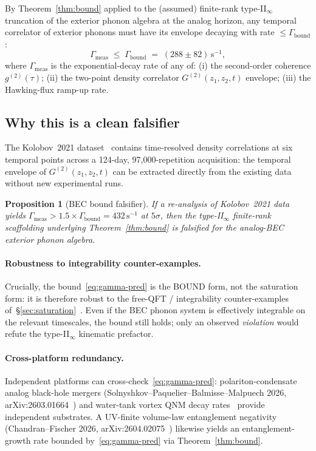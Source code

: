 \documentclass[12pt,a4paper]{article}
\newtheorem{proposition}[theorem]{Proposition}
\begin{document}
By Theorem~\ref{thm:bound} applied to the (assumed) finite-rank
type-II$_\infty$ truncation of the exterior phonon algebra at the
analog horizon, any temporal correlator of exterior phonons must
have its envelope decaying with rate $\le \Gamma_{\mathrm{bound}}$:
\begin{equation}
  \Gamma_{\mathrm{meas}}
  \;\le\;
  \Gamma_{\mathrm{bound}}
  \;=\;
  (288 \pm 82)\,\mathrm{s}^{-1},
  \label{eq:gamma-pred}
\end{equation}
where $\Gamma_{\mathrm{meas}}$ is the exponential-decay rate of any
of: (i) the second-order coherence $g^{(2)}(\tau)$; (ii) the
two-point density correlator $G^{(2)}(z_1,z_2,t)$ envelope;
(iii) the Hawking-flux ramp-up rate.

\subsection{Why this is a clean falsifier}

The Kolobov~2021 dataset~\cite{Kolobov2021} contains time-resolved
density correlations at six temporal points across a 124-day,
97{,}000-repetition acquisition: the temporal envelope of
$G^{(2)}(z_1,z_2,t)$ can be extracted directly from the existing
data without new experimental runs.

\begin{proposition}[BEC bound falsifier]
If a re-analysis of Kolobov~2021 data yields
$\Gamma_{\mathrm{meas}} > 1.5 \times \Gamma_{\mathrm{bound}}
= 432\,\mathrm{s}^{-1}$ at $5\sigma$, then the type-II$_\infty$
finite-rank scaffolding underlying Theorem~\ref{thm:bound} is
falsified for the analog-BEC exterior phonon algebra.
\end{proposition}

\paragraph{Robustness to integrability counter-examples.}
Crucially, the bound~\eqref{eq:gamma-pred} is the BOUND form,
not the saturation form: it is therefore robust to the free-QFT /
integrability counter-examples
of~\S\ref{sec:saturation}~\cite{AvdoshkinDymarsky2019,Camargo2023,Sreeram2025}.
Even if the BEC phonon system is effectively integrable on the
relevant timescales, the bound still holds; only an observed
\emph{violation} would refute the type-II$_\infty$ kinematic
prefactor.

\paragraph{Cross-platform redundancy.}
Independent platforms can cross-check~\eqref{eq:gamma-pred}:
polariton-condensate analog black-hole mergers
(Solnyshkov--Paquelier--Balmisse--Malpuech 2026,
arXiv:2603.01664~\cite{Solnyshkov2026}) and water-tank vortex QNM
decay rates~\cite{TorresPatrick2017} provide independent substrates.
A UV-finite volume-law entanglement negativity
(Chandran--Fischer 2026, arXiv:2604.02075~\cite{ChandranFischer2026})
likewise yields an entanglement-growth rate bounded
by~\eqref{eq:gamma-pred} via Theorem~\ref{thm:bound}.
\end{document}
